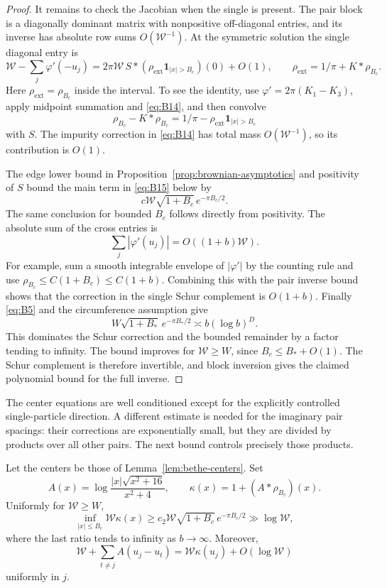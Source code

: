 \begin{proof}
It remains to check the Jacobian when the single is present.  The pair
block is a diagonally dominant matrix with nonpositive off-diagonal
entries, and its inverse has absolute row sums $O(\mathcal W^{-1})$.
At the symmetric solution the single diagonal entry is
\begin{equation}\label{eq:B15}
 \mathcal W-\sum_j\varphi'(-u_j)
   =2\pi\mathcal W\,
       S*(\rho_{\mathrm{ext}}\mathbf1_{|x|>B_c})(0)+O(1),
 \qquad \rho_{\mathrm{ext}}=1/\pi+K*\rho_{B_c}.
\end{equation}
Here $\rho_{\mathrm{ext}}=\rho_{B_c}$ inside the interval.  To see the
identity, use $\varphi'=2\pi(K_1-K_3)$, apply midpoint summation and
\eqref{eq:B14}, and then convolve
\[
 \rho_{B_c}-K*\rho_{B_c}
   =1/\pi-\rho_{\mathrm{ext}}\mathbf1_{|x|>B_c}
\]
with $S$.  The impurity correction in \eqref{eq:B14} has total mass
$O(\mathcal W^{-1})$, so its contribution is $O(1)$.

The edge lower bound in Proposition~\ref{prop:brownian-asymptotics}
and positivity of $S$ bound the main term in \eqref{eq:B15} below by
\[
 c\mathcal W\sqrt{1+B_c}\,e^{-\pi B_c/2}.
\]
The same conclusion for bounded $B_c$ follows directly from positivity.
The absolute sum of the cross entries is
\[
 \sum_j|\varphi'(u_j)|=O((1+b)\mathcal W).
\]
For example, sum a smooth integrable envelope of $|\varphi'|$ by the
counting rule and use $\rho_{B_c}\leq C(1+B_c)\leq C(1+b)$.
Combining this with the pair inverse bound shows that the correction in
the single Schur complement is $O(1+b)$.  Finally \eqref{eq:B5} and the
circumference assumption give
\[
 W\sqrt{1+B_*}\,e^{-\pi B_*/2}
       \asymp b(\log b)^D.
\]
This dominates the Schur correction and the bounded remainder by a factor
tending to infinity.  The bound improves for $\mathcal W\geq W$, since
$B_c\leq B_*+O(1)$.  The Schur complement is therefore invertible, and
block inversion gives the claimed polynomial bound for the full inverse.
\end{proof}

The center equations are well conditioned except for the explicitly
controlled single-particle direction.  A different estimate is needed
for the imaginary pair spacings: their corrections are exponentially
small, but they are divided by products over all other pairs.  The next
bound controls precisely those products.

\begin{lemma}
\label{lem:bethe-suppression}
Let the centers be those of Lemma~\ref{lem:bethe-centers}.  Set
\[
 A(x)=\log\frac{|x|\sqrt{x^2+16}}{x^2+4},
 \qquad \kappa(x)=1+(A*\rho_{B_c})(x).
\]
Uniformly for $\mathcal W\geq W$,
\begin{equation}\label{eq:B16}
 \inf_{|x|\leq B_c}\mathcal W\kappa(x)
    \geq c_2\mathcal W\sqrt{1+B_c}\,e^{-\pi B_c/2}
    \gg\log\mathcal W,
\end{equation}
where the last ratio tends to infinity as $b\to\infty$.  Moreover,
\[
 \mathcal W+\sum_{t\ne j}A(u_j-u_t)
    =\mathcal W\kappa(u_j)+O(\log\mathcal W)
\]
uniformly in $j$.
\end{lemma}

